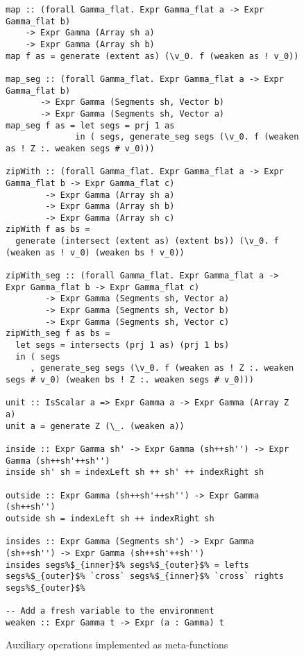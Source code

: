 \begin{figure}
\begin{lstlisting}[style=ndp]
map :: (forall Gamma_flat. Expr Gamma_flat a -> Expr Gamma_flat b)
    -> Expr Gamma (Array sh a)
    -> Expr Gamma (Array sh b)
map f as = generate (extent as) (\v_0. f (weaken as ! v_0))

map_seg :: (forall Gamma_flat. Expr Gamma_flat a -> Expr Gamma_flat b)
       -> Expr Gamma (Segments sh, Vector b)
       -> Expr Gamma (Segments sh, Vector a)
map_seg f as = let segs = prj 1 as
              in ( segs, generate_seg segs (\v_0. f (weaken as ! Z :. weaken segs # v_0)))

zipWith :: (forall Gamma_flat. Expr Gamma_flat a -> Expr Gamma_flat b -> Expr Gamma_flat c)
        -> Expr Gamma (Array sh a)
        -> Expr Gamma (Array sh b)
        -> Expr Gamma (Array sh c)
zipWith f as bs =
  generate (intersect (extent as) (extent bs)) (\v_0. f (weaken as ! v_0) (weaken bs ! v_0))

zipWith_seg :: (forall Gamma_flat. Expr Gamma_flat a -> Expr Gamma_flat b -> Expr Gamma_flat c)
        -> Expr Gamma (Segments sh, Vector a)
        -> Expr Gamma (Segments sh, Vector b)
        -> Expr Gamma (Segments sh, Vector c)
zipWith_seg f as bs =
  let segs = intersects (prj 1 as) (prj 1 bs)
  in ( segs
     , generate_seg segs (\v_0. f (weaken as ! Z :. weaken segs # v_0) (weaken bs ! Z :. weaken segs # v_0)))

unit :: IsScalar a => Expr Gamma a -> Expr Gamma (Array Z a)
unit a = generate Z (\_. (weaken a))

inside :: Expr Gamma sh' -> Expr Gamma (sh++sh'') -> Expr Gamma (sh++sh'++sh'')
inside sh' sh = indexLeft sh ++ sh' ++ indexRight sh

outside :: Expr Gamma (sh++sh'++sh'') -> Expr Gamma (sh++sh'')
outside sh = indexLeft sh ++ indexRight sh

insides :: Expr Gamma (Segments sh') -> Expr Gamma (sh++sh'') -> Expr Gamma (sh++sh'++sh'')
insides segs%$_{inner}$% segs%$_{outer}$% = lefts segs%$_{outer}$% `cross` segs%$_{inner}$% `cross` rights segs%$_{outer}$%

-- Add a fresh variable to the environment
weaken :: Expr Gamma t -> Expr (a : Gamma) t
\end{lstlisting}
\caption{Auxiliary operations implemented as meta-functions}
\label{fig:lst-auxiliary}
\end{figure}
%

